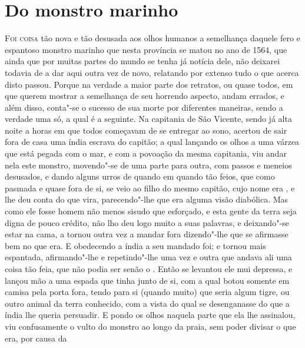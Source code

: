\chapter[Do monstro marinho]{Do monstro marinho}



\noindent\textsc{Foi coisa} tão nova e tão desusada aos olhos humanos a semelhança		%
daquele fero e espantoso monstro marinho que nesta província se matou no
ano de 1564, que ainda que por muitas partes do mundo se tenha já
notícia dele, não deixarei todavia de a dar aqui outra vez de novo,
relatando por extenso tudo o que acerca disto passou. Porque na verdade
a maior parte dos retratos, ou quase todos, em que querem mostrar a
semelhança de seu horrendo aspecto, andam errados, e além disso,
conta"-se o sucesso de sua morte por diferentes maneiras, sendo a
verdade uma só, a qual é a seguinte. Na capitania de São Vicente, sendo				%
já alta noite a horas em que todos começavam de se entregar ao sono,
acertou de sair fora de casa uma índia escrava do capitão; a qual
lançando os olhos a uma várzea que está pegada com o mar, e com a
povoação da mesma capitania, viu andar nela este monstro, movendo"-se de
uma parte para outra, com passos e meneios desusados, e dando alguns urros
de quando em quando tão feios, que como pasmada e quase fora de si, se
veio ao filho do mesmo capitão, cujo nome era , e lhe
deu conta do que vira, parecendo"-lhe que era alguma visão diabólica.
Mas como ele fosse homem não menos sisudo que esforçado, e esta gente
da terra seja digna de pouco crédito, não lho deu logo muito a suas
palavras, e deixando"-se estar na cama, a tornou outra vez a mandar
fora dizendo"-lhe que se afirmasse bem no que era. E obedecendo a índia
a seu mandado foi; e tornou mais espantada, afirmando"-lhe e
repetindo"-lhe uma vez e outra que andava ali uma coisa tão feia, que não
podia ser senão o . Então se levantou ele mui depressa, e
lançou mão a uma espada que tinha junto de si, com a qual botou somente
em camisa pela porta fora, tendo para si (quando muito) que seria algum
tigre, ou outro animal da terra conhecido, com a vista do qual se			%
desenganasse do que a índia lhe queria persuadir. E pondo os olhos
naquela parte que ela lhe assinalou, viu confusamente o vulto do
monstro ao longo da praia, sem poder divisar o que era, por causa da
